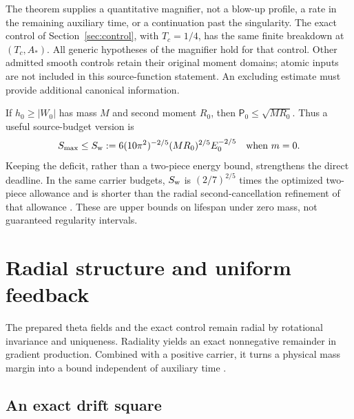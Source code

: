 \documentclass[11pt]{article}
\numberwithin{equation}{section}
\begin{document}
The theorem supplies a quantitative magnifier, not a blow-up profile,
a rate in the remaining auxiliary time, or a continuation past the
singularity. The exact control of Section~\ref{sec:control}, with
$T_c=1/4$, has the same finite breakdown at $(T_c,A_*)$.
All generic hypotheses of the magnifier hold for that control.
Other admitted smooth controls retain their original moment domains;
atomic inputs are not included in this source-function statement.
An excluding estimate must provide additional canonical information.


If $h_0\ge|W_0|$ has mass $M$ and second moment $R_0$, then
$\mathsf P_0\le\sqrt{MR_0}$. Thus a useful source-budget version is
\begin{equation}\label{eq:weighteddeadline}
 S_{\max}\le S_{\rm w}:=
       6(10\pi^2)^{-2/5}(MR_0)^{2/5}E_0^{-2/5}
       \quad\hbox{when }m=0.
\end{equation}
Keeping the deficit, rather than a two-piece energy bound, strengthens
the direct deadline. In the same carrier budgets, $S_{\rm w}$ is
$(2/7)^{2/5}$ times the optimized two-piece allowance and is shorter
than the radial second-cancellation refinement of that allowance
\cite{DirectDeadlineNote,SecondCancellationNote}.
These are upper bounds on lifespan under zero mass, not guaranteed
regularity intervals.

\section{Radial structure and uniform feedback}\label{sec:radialgain}

The prepared theta fields and the exact control remain radial by
rotational invariance and uniqueness. Radiality yields an exact
nonnegative remainder in gradient production. Combined with a
positive carrier, it turns a physical mass margin into a bound
independent of auxiliary time \cite{RadialDriftNote,UniformFeedbackNote}.

\subsection{An exact drift square}
\end{document}
